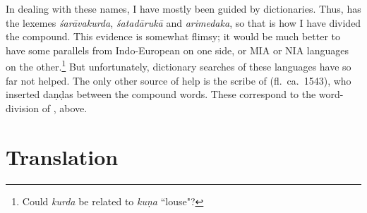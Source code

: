     In dealing with these names, I have mostly been guided by
dictionaries. Thus, \citet{moni-sans} has the lexemes
\emph{śarāvakurda}, \emph{śatadārukā} and \emph{arimedaka}, so
that is how I have divided the compound.  This evidence is
somewhat flimsy; it would be much better to have some parallels
from Indo-European on one side, or MIA or NIA languages on the
other.\footnote{Could \emph{kurda} be related to \emph{kuṇa}
    “louse"?}  But unfortunately, dictionary searches of these
    languages have so far not helped.  The only other source of help is
    the scribe of  (fl.\ ca.\ 1543), who
    inserted daṇḍas between the compound words.  These correspond to
    the word-division of \citet{moni-sans}, above.
        

\section{Translation}

